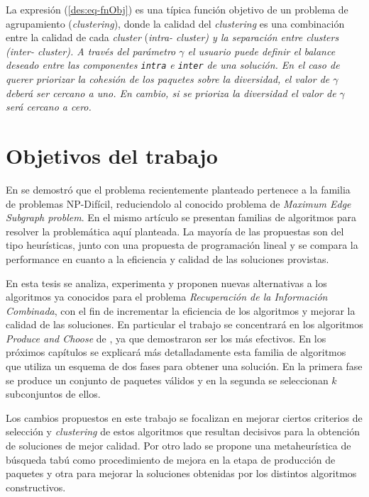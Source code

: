 La expresión (\ref{des:eq-fnObj}) es una típica función objetivo de un problema de agrupamiento ({\em clustering}), donde la calidad del {\em clustering} es una combinación entre la calidad de cada {\em cluster} (\em{intra}- cluster) y la separación entre {\em clusters} (\em{inter}- cluster). A través del parámetro $\gamma$ el usuario puede definir el balance deseado entre las componentes \texttt{intra} e \texttt{inter} de una solución. En el caso de querer priorizar la cohesión de los paquetes sobre la diversidad, el  valor de $\gamma$ deberá ser cercano a uno. En cambio, si se prioriza la diversidad el valor de $\gamma$ será cercano a cero.

\section{Objetivos del trabajo}
En \cite{journals/tkde/Amer-YahiaBCFMZ14} se demostró que el problema recientemente planteado pertenece a la familia de problemas NP-Difícil, reduciendolo al conocido problema de {\em Maximum Edge Subgraph problem}. En el mismo artículo se presentan familias de algoritmos para resolver la problemática aquí planteada. La mayoría de las propuestas son del tipo heurísticas, junto con una propuesta de programación lineal y se compara la performance en cuanto a la eficiencia y calidad de las soluciones provistas.

En esta tesis se analiza, experimenta y proponen nuevas alternativas a los algoritmos ya conocidos para el problema {\em Recuperación de la Información Combinada}, con el fin de incrementar la eficiencia de los algoritmos y mejorar la calidad de las soluciones. En particular el trabajo se concentrará en los algoritmos {\em Produce and Choose} de \cite{journals/tkde/Amer-YahiaBCFMZ14}, ya que demostraron ser los más efectivos. En los próximos capítulos se explicará más detalladamente esta familia de algoritmos que utiliza un esquema de dos fases para obtener una solución. En la primera fase se produce un conjunto de paquetes válidos y en la segunda se seleccionan $k$ subconjuntos de ellos.

Los cambios propuestos en este trabajo se focalizan en mejorar ciertos criterios de selección y {\em clustering} de estos algoritmos que resultan decisivos para la obtención de soluciones de mejor calidad. Por otro lado se propone una metaheurística de búsqueda tabú como procedimiento de mejora en la etapa de producción de paquetes y otra para mejorar la soluciones obtenidas por los distintos algoritmos constructivos.

